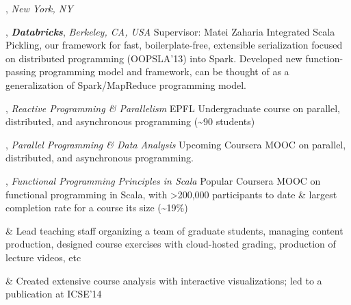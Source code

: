 \documentclass[9pt]{article}
\begin{document}
, \emph{New York, NY} \vspace{0.01in}  
\bigskip

\medskip
{}

, {\bf \em Databricks}, \emph{Berkeley, CA, USA} \vspace{0.01in} 
\newline\noindent Supervisor: Matei Zaharia
\newline\noindent Integrated Scala Pickling, our framework for fast, boilerplate-free, extensible
\newline\noindent serialization focused on distributed programming (OOPSLA'13) into Spark.
\newline\noindent Developed new function-passing programming model and framework, can be
\newline\noindent thought of as a generalization of Spark/MapReduce programming model.
\bigskip

\medskip
{}

, {\em Reactive Programming \& Parallelism} 
\newline\noindent EPFL Undergraduate course on parallel, distributed, and asynchronous
\newline\noindent programming (\textasciitilde90 students)
\bigskip

, {\em Parallel Programming \& Data Analysis} 
\newline\noindent Upcoming Coursera MOOC on parallel, distributed, and asynchronous
\newline\noindent programming.
\bigskip

, {\em Functional Programming Principles in Scala} 
\newline\noindent Popular Coursera MOOC on functional programming in Scala,
\newline\noindent with >200,000 participants to date \& largest completion
\newline\noindent rate for a course its size (\textasciitilde19\%)
\vspace{0.05in}
\begin{easylist}[itemize]
& Lead teaching staff organizing a team of graduate students,
\newline managing content production, designed course exercises
\newline with cloud-hosted grading, production of lecture videos, etc

& Created extensive course analysis with interactive
\newline visualizations; led to a publication at ICSE'14
\end{easylist}
\bigskip
\end{document}
